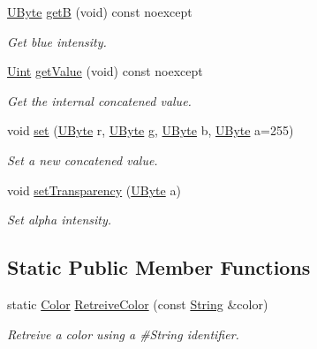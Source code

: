 \begin{DoxyCompactItemize}
\mbox{\hyperlink{namespaceo_a_a8c38e43a304d568b8495770dd8d50513}{U\+Byte}} \mbox{\hyperlink{classo_a_1_1_color_a8a30e79da1de484a4ff47ed2bcbc8e23}{getB}} (void) const noexcept
\begin{DoxyCompactList}\small\item\em Get blue intensity. \end{DoxyCompactList}\item 
\mbox{\hyperlink{namespaceo_a_abe1d8250226c5cf34f84d7b75fc7922e}{Uint}} \mbox{\hyperlink{classo_a_1_1_color_ac010d6318a14cebb3123929159fbab93}{get\+Value}} (void) const noexcept
\begin{DoxyCompactList}\small\item\em Get the internal concatened value. \end{DoxyCompactList}\item 
void \mbox{\hyperlink{classo_a_1_1_color_aaf0ba215d5bd4946f93a68bab2a8d66d}{set}} (\mbox{\hyperlink{namespaceo_a_a8c38e43a304d568b8495770dd8d50513}{U\+Byte}} r, \mbox{\hyperlink{namespaceo_a_a8c38e43a304d568b8495770dd8d50513}{U\+Byte}} g, \mbox{\hyperlink{namespaceo_a_a8c38e43a304d568b8495770dd8d50513}{U\+Byte}} b, \mbox{\hyperlink{namespaceo_a_a8c38e43a304d568b8495770dd8d50513}{U\+Byte}} a=255)
\begin{DoxyCompactList}\small\item\em Set a new concatened value. \end{DoxyCompactList}\item 
void \mbox{\hyperlink{classo_a_1_1_color_afa261cb70221d211e94a29b8f0484a02}{set\+Transparency}} (\mbox{\hyperlink{namespaceo_a_a8c38e43a304d568b8495770dd8d50513}{U\+Byte}} a)
\begin{DoxyCompactList}\small\item\em Set alpha intensity. \end{DoxyCompactList}\end{DoxyCompactItemize}
\subsection*{Static Public Member Functions}
\begin{DoxyCompactItemize}
\item 
static \mbox{\hyperlink{classo_a_1_1_color}{Color}} \mbox{\hyperlink{classo_a_1_1_color_ae637744de31ea0e978b58a836db49884}{Retreive\+Color}} (const \mbox{\hyperlink{classo_a_1_1_string}{String}} \&color)
\begin{DoxyCompactList}\small\item\em Retreive a color using a \#\+String identifier. \end{DoxyCompactList}\end{DoxyCompactItemize}


